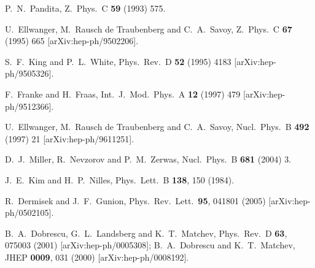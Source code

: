 \documentclass[aps,prl,twocolumn,nofootinbib,superscriptaddress]{revtex4}
\begin{document}
{\begin{thebibliography}{99}
  P.~N.~Pandita,
  Z.\ Phys.\  C {\bf 59} (1993) 575.

  U.~Ellwanger, M.~Rausch de Traubenberg and C.~A.~Savoy,
  Z.\ Phys.\  C {\bf 67} (1995) 665
  [arXiv:hep-ph/9502206].

  S.~F.~King and P.~L.~White,
  Phys.\ Rev.\  D {\bf 52} (1995) 4183
  [arXiv:hep-ph/9505326].

  F.~Franke and H.~Fraas,
  Int.\ J.\ Mod.\ Phys.\  A {\bf 12} (1997) 479
  [arXiv:hep-ph/9512366].

  U.~Ellwanger, M.~Rausch de Traubenberg and C.~A.~Savoy,
  Nucl.\ Phys.\  B {\bf 492} (1997) 21
  [arXiv:hep-ph/9611251].


  D.~J.~Miller, R.~Nevzorov and P.~M.~Zerwas,
  Nucl.\ Phys.\  B {\bf 681} (2004) 3.
  
J.~E.~Kim and H.~P.~Nilles,
  Phys.\ Lett.\  B {\bf 138}, 150 (1984).

  R.~Dermisek and J.~F.~Gunion,
  Phys.\ Rev.\ Lett.\  {\bf 95}, 041801 (2005)
  [arXiv:hep-ph/0502105].

B.~A.~Dobrescu, G.~L.~Landsberg and K.~T.~Matchev,
  Phys.\ Rev.\  D {\bf 63}, 075003 (2001)
  [arXiv:hep-ph/0005308];
%
 B.~A.~Dobrescu and K.~T.~Matchev,
  JHEP {\bf 0009}, 031 (2000)
  [arXiv:hep-ph/0008192].
  

\end{thebibliography}}
\end{document}

